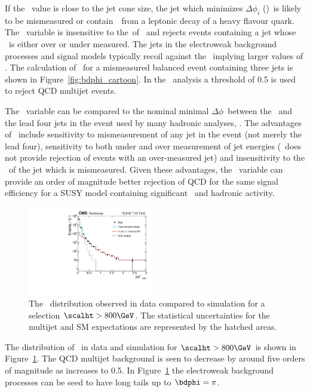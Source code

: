 If the \bdphi~value is close to the jet cone size, the jet which minimizes $\Delta \phi_i$ (\jbdphi)~is likely 
to be mismeasured or contain~\met~from a leptonic decay of a heavy flavour quark. The \bdphi~variable is insensitive to
the~\pt of \jbdphi~and rejects events containing a jet whose \pt~is either over or under measured.
The jets in the electroweak background processes and signal models typically recoil against the
\met~implying larger values of \bdphi. The calculation of \bdphi~for a mismeasured balanced 
event containing three jets is shown in Figure~\ref{fig:bdphi_cartoon}.
In the \alphat~analysis a threshold of 0.5 is used to reject QCD multijet events.

The \bdphi~variable can be compared to the nominal minimal $\Delta \phi$~between
the \mht~and the lead four jets in the event used by many hadronic analyses, \dphimhtj.
The advantages of \bdphi~include sensitivity to mismeasurement of any jet in the 
event (not merely the lead four), sensitivity to both under and over measurement
of jet energies (\dphimhtj~does not provide rejection of events with an over-measured jet)
and insensitivity to the \pt~of the jet which is mismeasured. Given these advantages, 
the \bdphi~variable can provide an order of magnitude better rejection of QCD for the 
same signal efficiency for a SUSY model containing significant \met~and hadronic activity.

\begin{figure}[!htb]
  \centering
    \includegraphics[width=0.49\textwidth]{./Figures/alphat/bdphi_data.pdf}
  \caption{
    The \bdphi~distribution observed in data compared to simulation for a selection $\scalht > 800\GeV$.
    The statistical uncertainties for the multijet and SM expectations are represented by the hatched areas. 
    }
  \label{fig:bdphi-data}
\end{figure}

The distribution of \bdphi~in data and simulation for $\scalht > 800\GeV$ is shown in Figure~\ref{fig:bdphi-data}.
The QCD multijet background is seen to decrease by around five orders of magnitude as \bdphi increases
to 0.5. In Figure~\ref{fig:bdphi-data} the electroweak background processes
can be seed to have long tails up to $\bdphi = \pi$.

